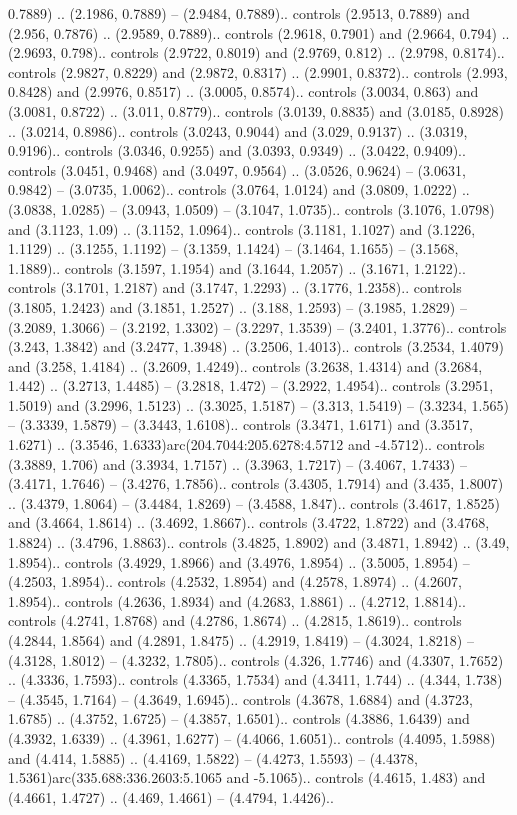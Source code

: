 0.7889) .. (2.1986, 0.7889) -- (2.9484, 0.7889).. controls (2.9513, 0.7889) and (2.956, 0.7876) .. (2.9589, 0.7889).. controls (2.9618, 0.7901) and (2.9664, 0.794) .. (2.9693, 0.798).. controls (2.9722, 0.8019) and (2.9769, 0.812) .. (2.9798, 0.8174).. controls (2.9827, 0.8229) and (2.9872, 0.8317) .. (2.9901, 0.8372).. controls (2.993, 0.8428) and (2.9976, 0.8517) .. (3.0005, 0.8574).. controls (3.0034, 0.863) and (3.0081, 0.8722) .. (3.011, 0.8779).. controls (3.0139, 0.8835) and (3.0185, 0.8928) .. (3.0214, 0.8986).. controls (3.0243, 0.9044) and (3.029, 0.9137) .. (3.0319, 0.9196).. controls (3.0346, 0.9255) and (3.0393, 0.9349) .. (3.0422, 0.9409).. controls (3.0451, 0.9468) and (3.0497, 0.9564) .. (3.0526, 0.9624) -- (3.0631, 0.9842) -- (3.0735, 1.0062).. controls (3.0764, 1.0124) and (3.0809, 1.0222) .. (3.0838, 1.0285) -- (3.0943, 1.0509) -- (3.1047, 1.0735).. controls (3.1076, 1.0798) and (3.1123, 1.09) .. (3.1152, 1.0964).. controls (3.1181, 1.1027) and (3.1226, 1.1129) .. (3.1255, 1.1192) -- (3.1359, 1.1424) -- (3.1464, 1.1655) -- (3.1568, 1.1889).. controls (3.1597, 1.1954) and (3.1644, 1.2057) .. (3.1671, 1.2122).. controls (3.1701, 1.2187) and (3.1747, 1.2293) .. (3.1776, 1.2358).. controls (3.1805, 1.2423) and (3.1851, 1.2527) .. (3.188, 1.2593) -- (3.1985, 1.2829) -- (3.2089, 1.3066) -- (3.2192, 1.3302) -- (3.2297, 1.3539) -- (3.2401, 1.3776).. controls (3.243, 1.3842) and (3.2477, 1.3948) .. (3.2506, 1.4013).. controls (3.2534, 1.4079) and (3.258, 1.4184) .. (3.2609, 1.4249).. controls (3.2638, 1.4314) and (3.2684, 1.442) .. (3.2713, 1.4485) -- (3.2818, 1.472) -- (3.2922, 1.4954).. controls (3.2951, 1.5019) and (3.2996, 1.5123) .. (3.3025, 1.5187) -- (3.313, 1.5419) -- (3.3234, 1.565) -- (3.3339, 1.5879) -- (3.3443, 1.6108).. controls (3.3471, 1.6171) and (3.3517, 1.6271) .. (3.3546, 1.6333)arc(204.7044:205.6278:4.5712 and -4.5712).. controls (3.3889, 1.706) and (3.3934, 1.7157) .. (3.3963, 1.7217) -- (3.4067, 1.7433) -- (3.4171, 1.7646) -- (3.4276, 1.7856).. controls (3.4305, 1.7914) and (3.435, 1.8007) .. (3.4379, 1.8064) -- (3.4484, 1.8269) -- (3.4588, 1.847).. controls (3.4617, 1.8525) and (3.4664, 1.8614) .. (3.4692, 1.8667).. controls (3.4722, 1.8722) and (3.4768, 1.8824) .. (3.4796, 1.8863).. controls (3.4825, 1.8902) and (3.4871, 1.8942) .. (3.49, 1.8954).. controls (3.4929, 1.8966) and (3.4976, 1.8954) .. (3.5005, 1.8954) -- (4.2503, 1.8954).. controls (4.2532, 1.8954) and (4.2578, 1.8974) .. (4.2607, 1.8954).. controls (4.2636, 1.8934) and (4.2683, 1.8861) .. (4.2712, 1.8814).. controls (4.2741, 1.8768) and (4.2786, 1.8674) .. (4.2815, 1.8619).. controls (4.2844, 1.8564) and (4.2891, 1.8475) .. (4.2919, 1.8419) -- (4.3024, 1.8218) -- (4.3128, 1.8012) -- (4.3232, 1.7805).. controls (4.326, 1.7746) and (4.3307, 1.7652) .. (4.3336, 1.7593).. controls (4.3365, 1.7534) and (4.3411, 1.744) .. (4.344, 1.738) -- (4.3545, 1.7164) -- (4.3649, 1.6945).. controls (4.3678, 1.6884) and (4.3723, 1.6785) .. (4.3752, 1.6725) -- (4.3857, 1.6501).. controls (4.3886, 1.6439) and (4.3932, 1.6339) .. (4.3961, 1.6277) -- (4.4066, 1.6051).. controls (4.4095, 1.5988) and (4.414, 1.5885) .. (4.4169, 1.5822) -- (4.4273, 1.5593) -- (4.4378, 1.5361)arc(335.688:336.2603:5.1065 and -5.1065).. controls (4.4615, 1.483) and (4.4661, 1.4727) .. (4.469, 1.4661) -- (4.4794, 1.4426).. 